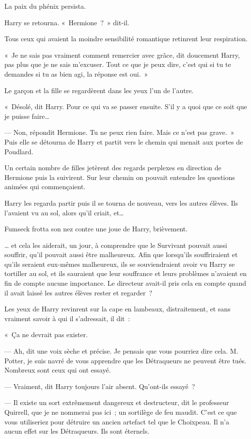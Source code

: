 La paix du phénix persista.

Harry se retourna.
«~Hermione~?~»
dit-il.

Tous ceux qui avaient la moindre sensibilité romantique retinrent leur respiration.

«~Je ne sais pas vraiment comment remercier avec grâce, dit doucement Harry, pas plus que je ne sais m'excuser.
Tout ce que je peux dire, c'est qui si tu te demandes si tu as bien agi, la réponse est oui.~»

Le garçon et la fille se regardèrent dans les yeux l'un de l'autre.

«~Désolé, dit Harry.
Pour ce qui va se passer ensuite.
S'il y a quoi que ce soit que je puisse faire…

--- Non, répondit Hermione.
Tu ne peux rien faire.
Mais ce n'est pas grave.~»
Puis elle se détourna de Harry et partit vers le chemin qui menait aux portes de Poudlard.

Un certain nombre de filles jetèrent des regards perplexes en direction de Hermione puis la suivirent.
Sur leur chemin on pouvait entendre les questions animées qui commençaient.

Harry les regarda partir puis il se tourna de nouveau, vers les autres élèves.
Ils l'avaient vu au sol, alors qu'il criait, et…

Fumseck frotta son nez contre une joue de Harry, brièvement.

… et cela les aiderait, un jour, à comprendre que le Survivant pouvait aussi souffrir, qu'il pouvait aussi être malheureux.
Afin que lorsqu'ils souffriraient et qu'ils seraient eux-mêmes malheureux, ils se souviendraient avoir vu Harry se tortiller au sol, et ils sauraient que leur souffrance et leurs problèmes n'avaient en fin de compte aucune importance.
Le directeur avait-il pris cela en compte quand il avait laissé les autres élèves rester et regarder~?

Les yeux de Harry revinrent sur la cape en lambeaux, distraitement, et sans vraiment savoir à qui il s'adressait, il dit~:

«~Ça ne devrait pas exister.

--- Ah, dit une voix sèche et précise.
Je pensais que vous pourriez dire cela.
M. Potter, je suis navré de vous apprendre que les Détraqueurs ne peuvent être tués.
Nombreux sont ceux qui ont essayé.

--- Vraiment, dit Harry toujours l'air absent.
Qu'ont-ils essayé~?

--- Il existe un sort extrêmement dangereux et destructeur, dit le professeur Quirrell, que je ne nommerai pas ici~; un sortilège de feu maudit.
C'est ce que vous utiliseriez pour détruire un ancien artefact tel que le Choixpeau.
Il n'a aucun effet sur les Détraqueurs.
Ils sont éternels.

